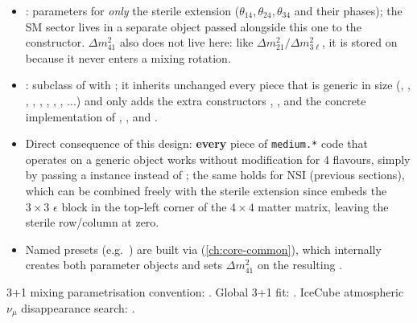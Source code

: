 \begin{implbox}
\begin{itemize}
  \item {}: parameters for \emph{only} the sterile
    extension ($\theta_{14},\theta_{24},\theta_{34}$ and their phases); the
    SM sector lives in a separate  object passed
    alongside this one to the  constructor.
    $\Delta m^2_{41}$ also does not live here: like
    $\Delta m^2_{21}/\Delta m^2_{3\ell}$, it is stored on
     because it never enters a mixing
    rotation.
  \item {}: subclass of 
    with ; it inherits unchanged every piece that is
    generic in size (, , ,
    , , ,
    , , ...) and only adds the extra
    constructors , ,  and the concrete
    implementation of , , and
    .
  \item Direct consequence of this design: \textbf{every} piece of
    \texttt{medium.*} code that operates on a generic  object
    works without modification for 4 flavours, simply by passing a
     instance instead of ; the same
    holds for NSI (previous sections), which can be combined freely with
    the sterile extension since  embeds
    the $3\times3$ $\epsilon$ block in the top-left corner of the
    $4\times4$ matter matrix, leaving the sterile row/column at zero.
  \item Named presets (e.g.\ ) are
    built via 
    (\cref{ch:core-common}), which internally creates both parameter
    objects and sets $\Delta m^2_{41}$ on the resulting
    .
\end{itemize}
\end{implbox}

\begin{refbox}
3+1 mixing parametrisation convention: \cite{KoppMachadoMaltoniSchwetz2013}.
Global 3+1 fit: \cite{GariazzoGiuntiLavederLi2017}. IceCube atmospheric
$\nu_\mu$ disappearance search: \cite{IceCube2020SterileNumuDisappearance}.
\end{refbox}


